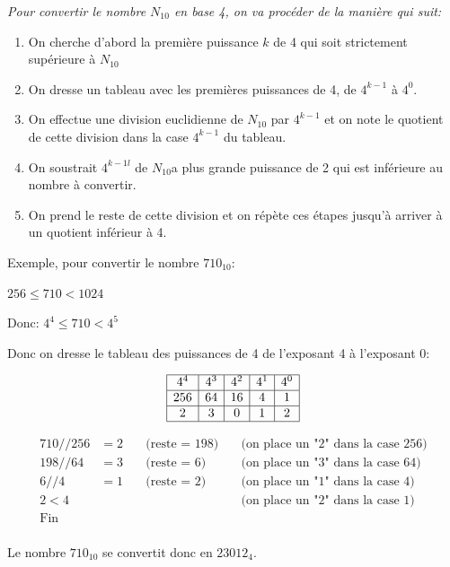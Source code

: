 \documentclass[12pt]{article}
\newenvironment{MaReponse}
		{\begin{greyedtextbox}\itshape} %
		{\end{greyedtextbox}}            %
\begin{document}
	\begin{MaReponse}
		Pour convertir le nombre $N_{10}$ en base 4, on va procéder de la manière qui suit:
		\begin{enumerate}
			\item On cherche d'abord la première puissance $k$ de 4 qui soit strictement supérieure à $N_{10}$
			\item On dresse un tableau avec les premières puissances de 4, de $4^{k-1}$ à $4^0$.
			\item On effectue une division euclidienne de $N_{10}$ par $4^{k-1}$ et on note le quotient de cette division dans la case $4^{k-1}$ du tableau.
			\item On soustrait $4^{k-1l}$ de $N_{10}$a plus grande puissance de 2 qui est inférieure au nombre à convertir.
			\item On prend le reste de cette division et on répète ces étapes jusqu'à arriver à un quotient inférieur à 4.
		\end{enumerate}

		Exemple, pour convertir le nombre $710_{10}$:
		
		$256 \le 710 < 1024$

		Donc: $4^4 \le 710 < 4^5$
		
		Donc on dresse le tableau des puissances de 4 de l'exposant 4 à l'exposant 0:
		
		\[
		\begin{array}{|c|c|c|c|c|c|c|}
		\hline
		4^4 & 4^3 & 4^2 & 4^1 & 4^0 \\
		\hline
		256 & 64 & 16 & 4 & 1 \\
		\hline
		2 & 3 & 0 & 1 & 2 \\
		\hline
		\end{array}
		\]
		
		\[
		\begin{array}{llll}
		710 // 256 &= 2 &\quad \text{(reste = } 198 \text{)} &\quad \text{(on place un "2" dans la case \(256\))} \\
		198 // 64 &= 3 &\quad \text{(reste = } 6 \text{)} &\quad \text{(on place un "3" dans la case \(64\))} \\
		6 // 4 &= 1 &\quad \text{(reste = } 2 \text{)} &\quad \text{(on place un "1" dans la case \(4\))} \\
		2 < 4 &&&\quad \text{(on place un "2" dans la case \(1\))} \\
		\text{Fin} & \\
		\end{array}
		\]
		
		Le nombre \(710_{10}\) se convertit donc en \(23012_{4}\).
		
	\end{MaReponse}
		
\end{document}
